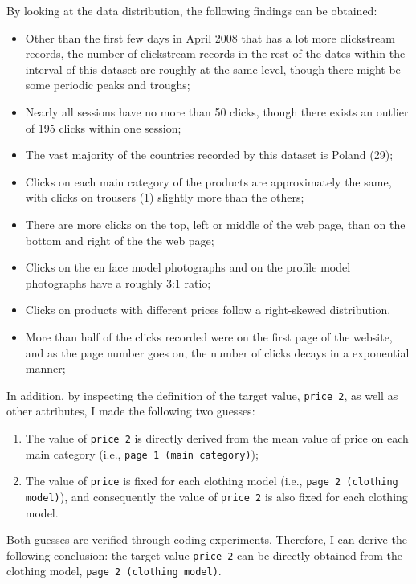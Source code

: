 \documentclass[12pt,twoside,a4paper]{article}
\begin{document}
By looking at the data distribution, the following findings can be obtained:

\begin{itemize}
    \item Other than the first few days in April 2008 that has a lot more clickstream records, the number of clickstream records in the rest of the dates within the interval of this dataset are roughly at the same level, though there might be some periodic peaks and troughs;
    \item Nearly all sessions have no more than 50 clicks, though there exists an outlier of 195 clicks within one session;
    \item The vast majority of the countries recorded by this dataset is Poland (29);
    \newpage
    \item Clicks on each main category of the products are approximately the same, with clicks on trousers (1) slightly more than the others;
    \item There are more clicks on the top, left or middle of the web page, than on the bottom and right of the the web page;
    \item Clicks on the en face model photographs and on the profile model photographs have a roughly 3:1 ratio;
    \item Clicks on products with different prices follow a right-skewed distribution. 
    \item More than half of the clicks recorded were on the first page of the website, and as the page number goes on, the number of clicks decays in a exponential manner;
\end{itemize}

In addition, by inspecting the definition of the target value, \texttt{price 2}, as well as other attributes, I made the following two guesses:

\begin{enumerate}
    \item The value of \texttt{price 2} is directly derived from the mean value of price on each main category (i.e., \texttt{page 1 (main category)});
    \item The value of \texttt{price} is fixed for each clothing model (i.e., \texttt{page 2 (clothing model)}), and consequently the value of \texttt{price 2} is also fixed for each clothing model.
\end{enumerate}

Both guesses are verified through coding experiments. Therefore, I can derive the following conclusion: the target value \texttt{price 2} can be directly obtained from the clothing model, \texttt{page 2 (clothing model)}.
\end{document}
